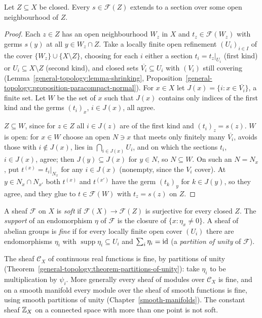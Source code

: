 \begin{lemma}\label{sheaf-cohomology:lemma-closed-sections-extend}
Let $Z \subseteq X$ be closed. Every $s \in \mathcal{F}(Z)$ extends to a section over some open neighbourhood of $Z$.
\end{lemma}

\begin{proof}
Each $z \in Z$ has an open neighbourhood $W_z$ in $X$ and $t_z \in \mathcal{F}(W_z)$ with germs $s(y)$ at all $y \in W_z \cap Z$. Take a locally finite open refinement $(U_i)_{i \in I}$ of the
cover $\{W_z\} \cup \{X \setminus Z\}$, choosing for each $i$ either a section $t_i = t_z|_{U_i}$ (first kind) or $U_i \subseteq X \setminus Z$ (second kind), and closed sets
$\overline{V_i} \subseteq U_i$ with $(V_i)$ still covering (Lemma~\ref{general-topology:lemma-shrinking}, Proposition~\ref{general-topology:proposition-paracompact-normal}). For $x \in X$
let $J(x) = \{i : x \in \overline{V_i}\}$, a finite set. Let $W$ be the set of $x$ such that $J(x)$ contains only indices of the first kind and the germs $(t_i)_x$, $i \in J(x)$, all agree.

$Z \subseteq W$, since for $z \in Z$ all $i \in J(z)$ are of the first kind and $(t_i)_z = s(z)$. $W$ is open: for $x \in W$ choose an open $N \ni x$ that meets only finitely many $\overline{V_i}$,
avoids those with $i \notin J(x)$, lies in $\bigcap_{i \in J(x)}U_i$, and on which the sections $t_i$, $i \in J(x)$, agree; then $J(y) \subseteq J(x)$ for $y \in N$, so $N \subseteq W$. On such an
$N = N_x$, put $t^{(x)} = t_i|_{N_x}$ for any $i \in J(x)$ (nonempty, since the $V_i$ cover). At $y \in N_x \cap N_{x'}$ both $t^{(x)}$ and $t^{(x')}$ have the germ $(t_k)_y$ for $k \in J(y)$, so
they agree, and they glue to $t \in \mathcal{F}(W)$ with $t_z = s(z)$ on $Z$.
\end{proof}

\begin{definition}\label{sheaf-cohomology:definition-soft-fine}
A sheaf $\mathcal{F}$ on $X$ is \emph{soft} if $\mathcal{F}(X) \to \mathcal{F}(Z)$ is surjective for every closed $Z$. The \emph{support} of an endomorphism $\eta$ of $\mathcal{F}$ is the
closure of $\{x : \eta_x \neq 0\}$. A sheaf of abelian groups is \emph{fine} if for every locally finite open cover $(U_i)$ there are endomorphisms $\eta_i$ with
$\operatorname{supp}\eta_i \subseteq U_i$ and $\sum_i\eta_i = \mathrm{id}$ (a \emph{partition of unity} of $\mathcal{F}$).
\end{definition}

\begin{example}\label{sheaf-cohomology:example-fine}
The sheaf $\mathcal{C}_X$ of continuous real functions is fine, by partitions of unity (Theorem~\ref{general-topology:theorem-partitions-of-unity}): take $\eta_i$ to be
multiplication by $\psi_i$. More generally every sheaf of modules over $\mathcal{C}_X$ is fine, and on a smooth manifold every module over the sheaf of smooth functions is fine,
using smooth partitions of unity (Chapter~\ref{smooth-manifolds}). The constant sheaf $\mathbb{Z}_X$ on a connected space with more than one point is not soft.
\end{example}

